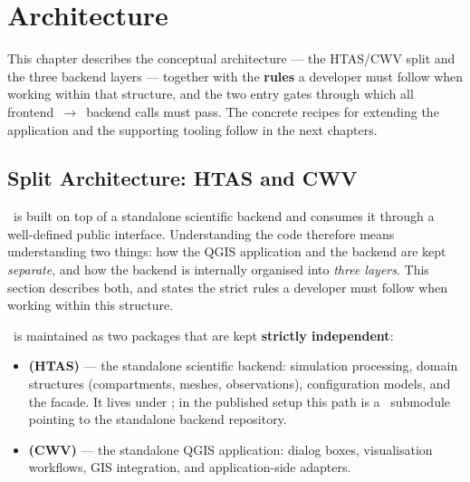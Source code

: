 \chapter{Architecture}
\label{chap-dev}
\label{chap-description-src}

\renewcommand{\headrulewidth}{0.3pt}
\fancyhead[LE]{\thepage} \fancyhead[RE]{\nouppercase{\textbf{\leftmark}}}
\fancyhead[RO]{\thepage} \fancyhead[LO]{\nouppercase{\textbf{\rightmark}}}
\fancyfoot[L,C,R]{}

\setlength{\parindent}{0.35cm}

\minitoc
\newpage

This chapter describes the conceptual architecture --- the HTAS/CWV split and the three backend layers --- together with the \textbf{rules} a developer must follow when working within that structure, and the two entry gates through which all frontend~$\rightarrow$~backend calls must pass. The concrete recipes for extending the application and the supporting tooling follow in the next chapters.

\section{Split Architecture: HTAS and CWV}
\label{sec-split}

\cwv~is built on top of a standalone scientific backend and consumes it through a well-defined public interface. Understanding the code therefore means understanding two things: how the QGIS application and the backend are kept \emph{separate}, and how the backend is internally organised into \emph{three layers}. This section describes both, and states the strict rules a developer must follow when working within this structure.

\cwv~is maintained as two packages that are kept \textbf{strictly independent}:

\begin{itemize}
    \item \textbf{ (HTAS)} --- the standalone scientific backend: simulation processing, domain structures (compartments, meshes, observations), configuration models, and the  facade. It lives under ; in the published setup this path is a \gitlab~submodule pointing to the standalone backend repository.
    \item \textbf{ (CWV)} --- the standalone QGIS application: dialog boxes, visualisation workflows, GIS integration, and application-side adapters.
\end{itemize}

